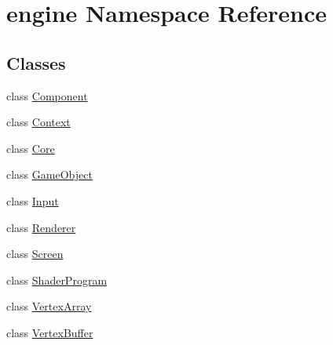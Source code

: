 \hypertarget{namespaceengine}{}\section{engine Namespace Reference}
\label{namespaceengine}
\subsection*{Classes}
\begin{DoxyCompactItemize}
\item 
class \mbox{\hyperlink{classengine_1_1_component}{Component}}
\item 
class \mbox{\hyperlink{classengine_1_1_context}{Context}}
\item 
class \mbox{\hyperlink{classengine_1_1_core}{Core}}
\item 
class \mbox{\hyperlink{classengine_1_1_game_object}{Game\+Object}}
\item 
class \mbox{\hyperlink{classengine_1_1_input}{Input}}
\item 
class \mbox{\hyperlink{classengine_1_1_renderer}{Renderer}}
\item 
class \mbox{\hyperlink{classengine_1_1_screen}{Screen}}
\item 
class \mbox{\hyperlink{classengine_1_1_shader_program}{Shader\+Program}}
\item 
class \mbox{\hyperlink{classengine_1_1_vertex_array}{Vertex\+Array}}
\item 
class \mbox{\hyperlink{classengine_1_1_vertex_buffer}{Vertex\+Buffer}}
\end{DoxyCompactItemize}
